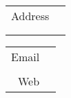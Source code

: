 \documentclass[10pt]{article}
\begin{document}


\begin{minipage}[t]{0.28\linewidth}
	{\huge\name}
\end{minipage}\hfill
\begin{minipage}[t]{0.3\linewidth}
	\small
	\begin{tabular}{rl}
		{\color{lightgray}Address} 	& \addressCO \\
   		 	                       	& \addressSTREET \\
        		                   	& \addressCITY \\
	\end{tabular}
\end{minipage}\hfill
\begin{minipage}[t]{0.32\linewidth}
	\small
	\begin{tabular}{rl}
		{\color{lightgray}Email} 	& \emailONE \\
									& \emailTWO \\
		{\color{lightgray}Web}		& \mywebpage
	\end{tabular}
\end{minipage}

\vspace{20pt}
\end{document}
